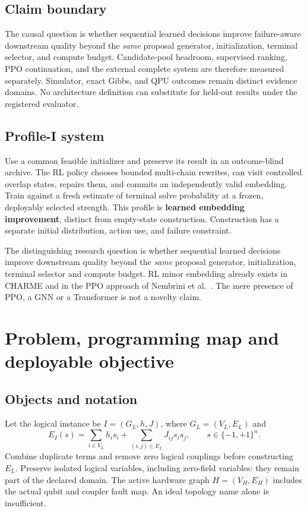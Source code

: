 \documentclass[11pt,a4paper]{article}
\theoremstyle{definition}\newtheorem{definition}[proposition]{Definition}
\begin{document}
\subsection*{Claim boundary}
The causal question is whether sequential learned decisions improve failure-aware downstream quality beyond the \emph{same} proposal generator, initialization, terminal selector, and compute budget. Candidate-pool headroom, supervised ranking, PPO continuation, and the external complete system are therefore measured separately. Simulator, exact Gibbs, and QPU outcomes remain distinct evidence domains. No architecture definition can substitute for held-out results under the registered evaluator.

\subsection*{Profile-I system}
Use a common feasible initializer and preserve its result in an outcome-blind archive. The RL policy chooses bounded multi-chain rewrites, can visit controlled overlap states, repairs them, and commits an independently valid embedding. Train against a fresh estimate of terminal solve probability at a frozen, deployably selected strength. This profile is \textbf{learned embedding improvement}, distinct from empty-state construction. Construction has a separate initial distribution, action use, and failure constraint.

The distinguishing research question is whether sequential learned decisions improve downstream quality beyond the \emph{same} proposal generator, initialization, terminal selector and compute budget. RL minor embedding already exists in CHARME and in the PPO approach of Nembrini et al.\ \cite{charme2024,nembrini2026}. The mere presence of PPO, a GNN or a Transformer is not a novelty claim.
 \clearpage{\small\setlength{\parskip}{0pt}\tableofcontents}
\clearpage{}
\section{Problem, programming map and deployable objective}\label{sec:objective}
\subsection{Objects and notation}
Let the logical instance be $I=(G_L,h,J)$, where $G_L=(V_L,E_L)$ and
\begin{equation}
E_I(s)=\sum_{i\in V_L}h_i s_i+\sum_{(i,j)\in E_L}J_{ij}s_i s_j,\qquad s\in\{-1,+1\}^{n}.
\end{equation}
Combine duplicate terms and remove zero logical couplings before constructing $E_L$. Preserve isolated logical variables, including zero-field variables: they remain part of the declared domain. The active hardware graph $H=(V_H,E_H)$ includes the actual qubit and coupler fault map. An ideal topology name alone is insufficient.
\end{document}
